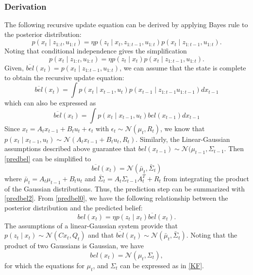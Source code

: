 \documentclass[twoside]{article}
\begin{document}
\subsubsection{Derivation}
The following recursive update equation can be derived by applying Bayes rule to the posterior distribution:
\begin{equation}
p(x_t \mid z_{1:t}, u_{1:t}) = \eta p(z_t \mid x_t, z_{1:t-1}, u_{1:t})p(x_t \mid z_{1:t-1}, u_{1:t}).
\end{equation} Noting that conditional independence gives the simplification
\begin{equation}
p(x_t \mid z_{1:t}, u_{1:t}) = \eta p(z_t \mid x_t)p(x_t \mid z_{1:t-1}, u_{1:t}). \label{predbel0}
\end{equation}
Given, $\overline{bel}(x_t) = p(x_t \mid z_{1:t-1},u_{1:t})$, we can assume that the state is complete to obtain the recursive update equation:
\begin{equation}
\overline{bel}(x_t) = \int p(x_t \mid x_{t-1}, u_t) p(x_{t-1} \mid z_{1:t-1}u_{1:t-1}) dx_{t-1}
\end{equation}
which can also be expressed as
\begin{equation}
\overline{bel}(x_t) = \int p(x_t \mid x_{t-1}, u_t) bel(x_{t-1}) dx_{t-1} \label{predbel}
\end{equation}
Since $x_t = A_tx_{t-1} + B_tu_t + \epsilon_t$ with $\epsilon_t \sim \mathcal{N}(\mu_t, R_t)$, we know that $p(x_t \mid x_{t-1}, u_t) \sim \mathcal{N}(A_tx_{t-1} + B_tu_t, R_t)$. Similarly, the Linear-Gaussian assumptions described above guarantee that $bel(x_{t-1}) \sim \mathcal{N}(\mu_{t-1}, \Sigma_{t-1}$. Then \eqref{predbel} can be simplified to
\begin{equation}
\overline{bel}(x_t) = \mathcal{N}(\bar{\mu}_t, \bar{\Sigma}_t) \label{predbel2}
\end{equation}
where $\bar{\mu}_t = A_t\mu_{t-1} + B_t u_t$ and $\bar{\Sigma}_t = A_t \Sigma_{t-1} A_t^T + R_t$ from integrating the product of the Gaussian distributions. Thus, the prediction step can be summarized with \eqref{predbel2}.
From \eqref{predbel0}, we have the following relationship between the posterior distribution and the predicted belief:
\begin{equation}
bel(x_t) = \eta p(z_t \mid x_t) \overline{bel}(x_t).
\end{equation}
The assumptions of a linear-Gaussian system provide that $p(z_t \mid x_t) \sim \mathcal{N}(Cx_t, Q_t)$ and that $\overline{bel}(x_t) \sim \mathcal{N}(\bar{\mu}_t, \bar{\Sigma}_t)$. Noting that the product of two Gaussians is Gaussian, we have
\begin{equation}
bel(x_t) = \mathcal{N}(\mu_t, \Sigma_t),
\end{equation}
for which the equations for $\mu_t$, and $\Sigma_t$ can be expressed as in \eqref{KF}.
\end{document}
